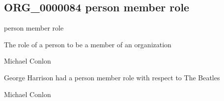 \documentclass[letterpaper,10pt,english]{sphinxmanual}
\begin{document}
\subsection{ORG\_0000084 \sphinxhyphen{} person member role}
\label{\detokenize{doc-ORG_0000084:org-0000084-person-member-role}}\label{\detokenize{doc-ORG_0000084:index-0}}\label{\detokenize{doc-ORG_0000084::doc}}
\begin{sphinxShadowBox}

\sphinxAtStartPar
person member role
\end{sphinxShadowBox}

\begin{sphinxShadowBox}

\sphinxAtStartPar
{\hyperref[\detokenize{doc-BFO_0000023::doc}]{}}
\end{sphinxShadowBox}

\begin{sphinxShadowBox}

\sphinxAtStartPar
The role of a person to be a member of an organization
\end{sphinxShadowBox}

\begin{sphinxShadowBox}

\sphinxAtStartPar
Michael Conlon 
\end{sphinxShadowBox}

\begin{sphinxShadowBox}

\sphinxAtStartPar
George Harrison had a person member role with respect to The Beatles
\end{sphinxShadowBox}

\begin{sphinxShadowBox}

\sphinxAtStartPar
Michael Conlon 
\end{sphinxShadowBox}
\begin{quote}

\ignorespaces \end{quote}
\end{document}
